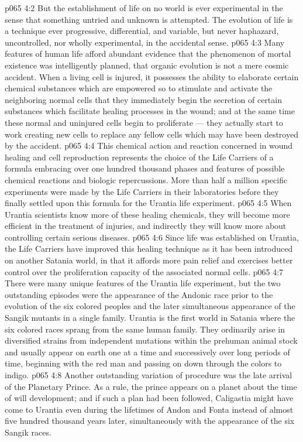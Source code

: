 \vs p065 4:2 But the establishment of life on no world is ever experimental in the sense that something untried and unknown is attempted. The evolution of life is a technique ever progressive, differential, and variable, but never haphazard, uncontrolled, nor wholly experimental, in the accidental sense.
\vs p065 4:3 \pc Many features of human life afford abundant evidence that the phenomenon of mortal existence was intelligently planned, that organic evolution is not a mere cosmic accident. When a living cell is injured, it possesses the ability to elaborate certain chemical substances which are empowered so to stimulate and activate the neighboring normal cells that they immediately begin the secretion of certain substances which facilitate healing processes in the wound; and at the same time these normal and uninjured cells begin to proliferate --- they actually start to work creating new cells to replace any fellow cells which may have been destroyed by the accident.
\vs p065 4:4 This chemical action and reaction concerned in wound healing and cell reproduction represents the choice of the Life Carriers of a formula embracing over one hundred thousand phases and features of possible chemical reactions and biologic repercussions. More than half a million specific experiments were made by the Life Carriers in their laboratories before they finally settled upon this formula for the Urantia life experiment.
\vs p065 4:5 When Urantia scientists know more of these healing chemicals, they will become more efficient in the treatment of injuries, and indirectly they will know more about controlling certain serious diseases.
\vs p065 4:6 Since life was established on Urantia, the Life Carriers have improved this healing technique as it has been introduced on another Satania world, in that it affords more pain relief and exercises better control over the proliferation capacity of the associated normal cells.
\vs p065 4:7 \pc There were many unique features of the Urantia life experiment, but the two outstanding episodes were the appearance of the Andonic race prior to the evolution of the six colored peoples and the later simultaneous appearance of the Sangik mutants in a single family. Urantia is the first world in Satania where the six colored races sprang from the same human family. They ordinarily arise in diversified strains from independent mutations within the prehuman animal stock and usually appear on earth one at a time and successively over long periods of time, beginning with the red man and passing on down through the colors to indigo.
\vs p065 4:8 Another outstanding variation of procedure was the late arrival of the Planetary Prince. As a rule, the prince appears on a planet about the time of will development; and if such a plan had been followed, Caligastia might have come to Urantia even during the lifetimes of Andon and Fonta instead of almost five hundred thousand years later, simultaneously with the appearance of the six Sangik races.
